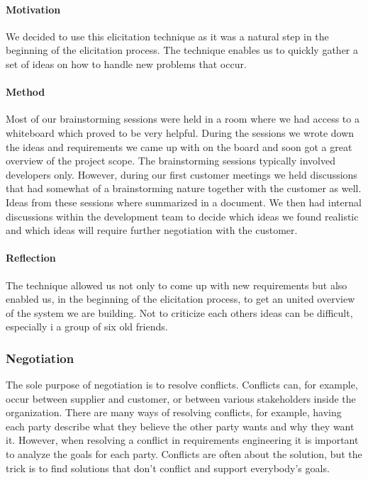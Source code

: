 \documentclass[10pt]{article}
\begin{document}
\paragraph{Motivation}
\hfill \break
We decided to use this elicitation technique as it was a natural step in the beginning of the elicitation process. The technique enables us to quickly gather a set of ideas on how to handle new problems that occur.

\paragraph{Method}
\hfill \break
Most of our brainstorming sessions were held in a room where we had access to a whiteboard which proved to be very helpful. During the sessions we wrote down the ideas and requirements we came up with on the board and soon got a great overview of the project scope. The brainstorming sessions typically involved developers only. However, during our first customer meetings we held discussions that had somewhat of a brainstorming nature together with the customer as well. Ideas from these sessions where summarized in a document. We then had internal discussions within the development team to decide which ideas we found realistic and which ideas will require further negotiation with the customer.
\paragraph{Reflection}
\hfill \break
The technique allowed us not only to come up with new requirements but also enabled us, in the beginning of the elicitation process, to get an united overview of the system we are building. Not to criticize each others ideas can be difficult, especially i a group of six old friends.

\subsubsection{Negotiation}
The sole purpose of negotiation is to resolve conflicts. Conflicts can, for example, occur between supplier and customer, or between various stakeholders inside the organization. There are many ways of resolving conflicts, for example, having each party describe what they believe the other party wants and why they want it. However, when resolving a conflict in requirements engineering it is important to analyze the goals for each party. Conflicts are often about the solution, but the trick is to find solutions that don’t conflict and support everybody’s goals.
\end{document}
